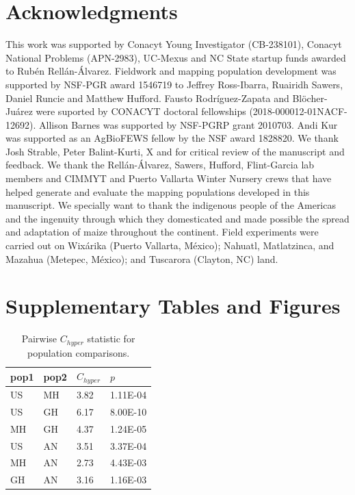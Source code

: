 \documentclass[9pt,twocolumn,twoside,lineno]{BioRxiv}
\begin{document}
\section{Acknowledgments}
This work was supported by Conacyt Young Investigator (CB-238101), Conacyt National Problems (APN-2983), UC-Mexus and NC State startup funds awarded to Rubén Rellán-Álvarez. 
Fieldwork and mapping population development was supported by NSF-PGR award 1546719 to Jeffrey Ross-Ibarra, Ruairidh Sawers, Daniel Runcie and Matthew Hufford.  
Fausto Rodríguez-Zapata and Blöcher-Juárez were suported by CONACYT doctoral fellowships (2018-000012-01NACF-12692).
Allison Barnes was supported by NSF-PGRP grant 2010703. 
Andi Kur was supported as an AgBioFEWS fellow by the NSF award 1828820.
We thank Josh Strable, Peter Balint-Kurti, X and  for critical review of the manuscript and feedback. 
We thank the Rellán-Álvarez, Sawers, Hufford, Flint-Garcia lab members and CIMMYT and Puerto Vallarta Winter Nursery crews that have helped generate and evaluate the mapping populations developed in this manuscript.
We specially want to thank the indigenous people of the Americas and the  ingenuity through which they domesticated and made possible the spread and adaptation of maize throughout the continent. 
Field experiments were carried out on Wixárika (Puerto Vallarta, México); Nahuatl, Matlatzinca, and Mazahua (Metepec, México); and Tuscarora (Clayton, NC) land.
\label{sec:acknowledgments}



\clearpage

\onecolumn

\section*{Supplementary Tables and Figures}

\begin{table}[h!]

\begin{tabular}{@{}llll@{}}
\toprule
pop1 & pop2 & $C_{hyper}$   & $p$  \\ \midrule
US   & MH   & 3.82 & 1.11E-04 \\
US   & GH   & 6.17 & 8.00E-10 \\
MH   & GH   & 4.37 & 1.24E-05 \\
US   & AN   & 3.51 & 3.37E-04 \\
MH   & AN   & 2.73 & 4.43E-03 \\
GH   & AN   & 3.16 & 1.16E-03 \\ \bottomrule
\end{tabular}
\label{tab:table1}
\caption{Pairwise $C_{hyper}$ statistic for population comparisons.}
\end{table}
\end{document}
